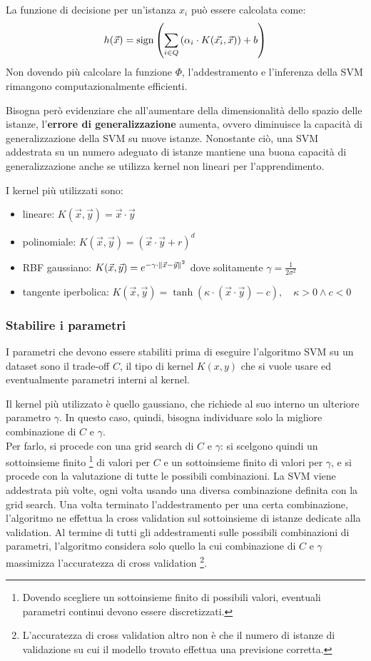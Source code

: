 La funzione di decisione per un'istanza $x_i$ può essere calcolata come:
\[
    h(\Vec{x}) = \textnormal{sign} \left(\sum\limits_{i \in Q} \left(\alpha_i \cdot K(\Vec{x_i}, \Vec{x})\right) + b\right)
\]
Non dovendo più calcolare la funzione $\Phi$, l'addestramento e l'inferenza della SVM rimangono computazionalmente efficienti.

Bisogna però evidenziare che all'aumentare della dimensionalità dello spazio delle istanze, l'\textbf{errore di generalizzazione} aumenta, ovvero diminuisce la capacità di generalizzazione della SVM su nuove istanze. Nonostante ciò, una SVM addestrata su un numero adeguato di istanze mantiene una buona capacità di generalizzazione anche se utilizza kernel non lineari per l'apprendimento.

I kernel più utilizzati sono:
\begin{itemize}
    \item lineare: $K(\Vec{x}, \Vec{y}) = \Vec{x} \cdot \Vec{y}$
    \item polinomiale: $K(\Vec{x}, \Vec{y}) = (\Vec{x} \cdot \Vec{y} + r)^d$
    \item RBF gaussiano: $K(\Vec{x}, \Vec{y}) = e^{-\gamma \cdot \left\lVert\Vec{x} - \Vec{y}\right\rVert^2}$ dove solitamente $\gamma = \frac{1}{2\sigma^2}$
    \item tangente iperbolica: $K(\Vec{x}, \Vec{y}) = \tanh (\kappa \cdot (\Vec{x} \cdot \Vec{y}) - c), \quad \kappa > 0 \land c < 0$
\end{itemize}

\subsubsection{Stabilire i parametri}
I parametri che devono essere stabiliti prima di eseguire l'algoritmo SVM su un dataset sono il trade-off $C$, il tipo di kernel $K(x, y)$ che si vuole usare ed eventualmente parametri interni al kernel.

Il kernel più utilizzato è quello gaussiano, che richiede al suo interno un ulteriore parametro $\gamma$. In questo caso, quindi, bisogna individuare solo la migliore combinazione di $C$ e $\gamma$.\\
Per farlo, si procede con una grid search di $C$ e $\gamma$: si scelgono quindi un sottoinsieme finito \footnote{Dovendo scegliere un sottoinsieme finito di possibili valori, eventuali parametri continui devono essere discretizzati.} di valori per $C$ e un sottoinsieme finito di valori per $\gamma$, e si procede con la valutazione di tutte le possibili combinazioni.
La SVM viene addestrata più volte, ogni volta usando una diversa combinazione definita con la grid search.
Una volta terminato l'addestramento per una certa combinazione, l'algoritmo ne effettua la cross validation sul sottoinsieme di istanze dedicate alla validation.
Al termine di tutti gli addestramenti sulle possibili combinazioni di parametri, l'algoritmo considera solo quello la cui combinazione di $C$ e $\gamma$ massimizza l'accuratezza di cross validation \footnote{L'accuratezza di cross validation altro non è che il numero di istanze di validazione su cui il modello trovato effettua una previsione corretta.}.

